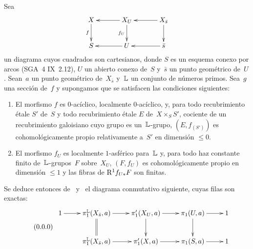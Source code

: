 
\subsection{}
\label{XIII.4.7} Sea
$$
\xymatrix@C=1.2cm{
X \ar[d]_-f&\ar[l] X_U \ar[d]_-{f_U}& \ar[l]X_{\bar{s}}\ar[d] \\
S&\ar[l] U &\ar[l]\bar{s}
}
$$
un
diagrama cuyos cuadrados son cartesianos, donde $S$ es un esquema conexo
por arcos (SGA~4 IX~2.12), $U$ un abierto conexo de~$S$ y~$\bar{s}$ un
punto geométrico de~$U$. Sean~$a$ un punto geométrico de~$X_{\bar{s}}$
y~$\mathbb L$ un conjunto de números primos. Sea~$g$ una sección de~$f$ y
supongamos que se satisfacen las condiciones siguientes:
\begin{enumerate}
\item[a)] El morfismo $f$ es $0$-acíclico, localmente $0$-acíclico,
y, para todo recubrimiento étale $S'$ de~$S$ y todo recubrimiento
étale $E$ de~$X\times_S S'$, cociente de un recubrimiento galoisiano
cuyo grupo es un~$\mathbb L$-grupo, $(E,f_{(S')})$ es cohomológicamente propio
relativamente a~$S'$ en dimensión $\leq 0$.
\item[b)] El morfismo $f_U$ es localmente $1$-asférico para~$\mathbb L$ y,
para todo haz constante finito de~$\mathbb L$-grupos~$F$ sobre~$X_U$, $(F,f_U)$
es cohomológicamente propio en dimensión $\leq 1$ y las fibras de
$\mathrm{R}^1 f_{U*}F$ son finitas.
\end{enumerate}

Se deduce entonces de~ y~ el diagrama
conmutativo siguiente, cuyas filas son exactas:
\begin{equation*}
\label{eq:XIII.4.7.0} \tag{\thesubsection.0} {}
\begin{array}{c}
\xymatrix{
1 \ar[r]& \pi_1^{\LL}(X_{\bar{s}},a) \ar[r]\ar@{=}[d]& \pi'_1(X_U,a) \ar[r]\ar[d]& \pi_1(U,a)\ar[r]\ar[d]& 1 \\
&\pi_1^{\LL}(X_{\bar{s}},a) \ar[r]&\pi'_1(X,a) \ar[r]& \pi_1(S,a) \ar[r]& 1
}
\end{array}
\end{equation*}

